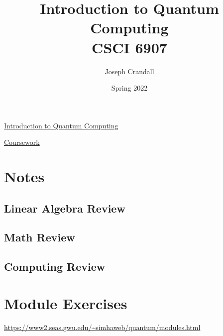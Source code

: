 
\usepackage{algorithm, algpseudocode, color, gensymb, siunitx, soul, subfiles}
\usepackage[a4paper, total={7.5in, 10in}]{geometry}

\title{Introduction to Quantum Computing\\
\large CSCI 6907}
\author{Joseph Crandall}
\date{Spring 2022}


\maketitle

\href{https://www2.seas.gwu.edu/~simhaweb/quantum/index.html}{Introduction to Quantum Computing}

\href{https://www2.seas.gwu.edu/~simhaweb/quantum/coursework.html}{Coursework}

\section{Notes}

\subsection{Linear Algebra Review}


\subsection{Math Review}


\subsection{Computing Review}


%

%

\section{Module Exercises}

\url{https://www2.seas.gwu.edu/~simhaweb/quantum/modules.html}

